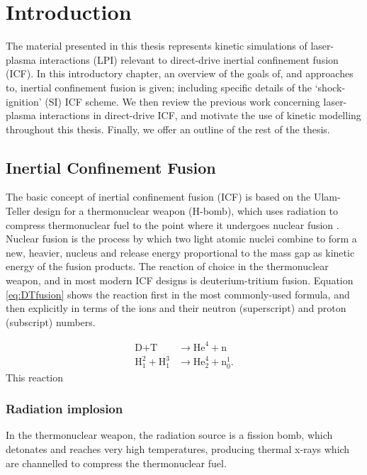 \chapter{Introduction}
\label{chp:introduction}
The material presented in this thesis represents kinetic simulations of laser-plasma interactions (\acrshort{LPI}) relevant to direct-drive inertial confinement fusion (\acrshort{ICF}). In this introductory chapter, an overview of the goals of, and approaches to, inertial confinement fusion is given; including specific details of the `shock-ignition' (\acrshort{SI}) ICF scheme. We then review the previous work concerning laser-plasma interactions in direct-drive ICF, and motivate the use of kinetic modelling throughout this thesis. Finally, we offer an outline of the rest of the thesis.

\section{Inertial Confinement Fusion}
The basic concept of inertial confinement fusion (\acrshort{ICF}) is based on the Ulam-Teller design for a thermonuclear weapon (H-bomb), which uses radiation to compress thermonuclear fuel to the point where it undergoes nuclear fusion \citep{SpanishHistoryOfICF}.  Nuclear fusion is the process by which two light atomic nuclei combine to form a new, heavier, nucleus and release energy proportional to the mass gap as kinetic energy of the fusion products. The reaction of choice in the thermonuclear weapon, and in most modern ICF designs is deuterium-tritium fusion. Equation \ref{eq:DTfusion} shows the reaction first in the most commonly-used formula, and then explicitly in terms of the ions and their neutron (superscript) and proton (subscript) numbers.

\begin{equation}\label{eq:DTfusion}
\begin{aligned}
	\text{D} + \text{T} &\longrightarrow \text{He}^4 + \text{n} \\
	\text{H}^2_1 + \text{H}^3_1 &\longrightarrow \text{He}^4_2 + \text{n}^1_0.
\end{aligned}
\end{equation}
This reaction 

\subsection{Radiation implosion}
In the thermonuclear weapon, the radiation source is a fission bomb, which detonates and reaches very high temperatures, producing thermal x-rays which are channelled to compress the thermonuclear fuel.

